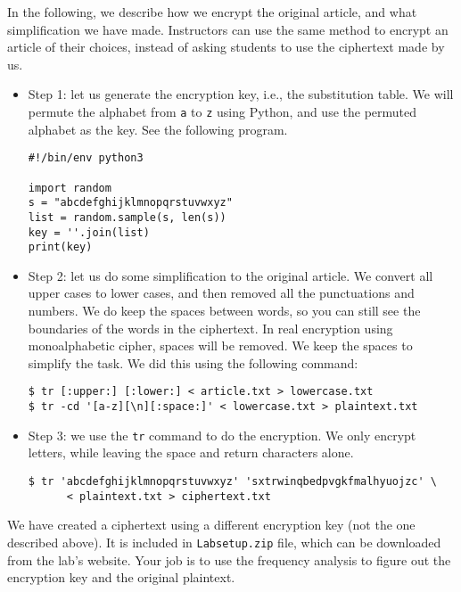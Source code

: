 In the following, we describe how we encrypt the original article, and what
simplification we have made. Instructors can use the same
method to encrypt an article of their choices, instead of asking
students to use the ciphertext made by us.

\begin{itemize}

\item Step 1: let us generate the encryption key, i.e., the substitution table.
We will permute the alphabet from \texttt{a}
to \texttt{z} using Python, and use the permuted alphabet as the key. See the following program.

\begin{lstlisting}
#!/bin/env python3
  
import random
s = "abcdefghijklmnopqrstuvwxyz"
list = random.sample(s, len(s))
key = ''.join(list)
print(key)
\end{lstlisting}

\item Step 2: let us do some simplification to the original article.
We convert all upper cases to lower cases, and then
removed all the punctuations and numbers.  We do keep the spaces between words, so
you can still see the boundaries of the words in the ciphertext.
In real encryption using monoalphabetic cipher,
spaces will be removed. We keep the spaces to simplify the task. We did this using the
following command:

\begin{lstlisting}
$ tr [:upper:] [:lower:] < article.txt > lowercase.txt
$ tr -cd '[a-z][\n][:space:]' < lowercase.txt > plaintext.txt
\end{lstlisting}


\item Step 3: we use the \texttt{tr} command to do the encryption.
We only encrypt letters, while leaving the space and return characters alone.


\begin{lstlisting}
$ tr 'abcdefghijklmnopqrstuvwxyz' 'sxtrwinqbedpvgkfmalhyuojzc' \
      < plaintext.txt > ciphertext.txt
\end{lstlisting}

\end{itemize}


We have created a ciphertext using a different encryption key (not the one described above).
It is included in \texttt{Labsetup.zip} file, which
can be downloaded from the lab's website. Your job is to use the frequency analysis
to figure out the encryption key and the original plaintext.



